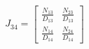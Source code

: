 \begin{equation}
    J_{34} = \begin{bmatrix}
    \frac{N_{13}}{D_{13}} & \frac{N_{23}}{D_{13}} \\
    \frac{N_{14}}{D_{14}} & \frac{N_{24}}{D_{14}}
    \end{bmatrix}
\end{equation}
